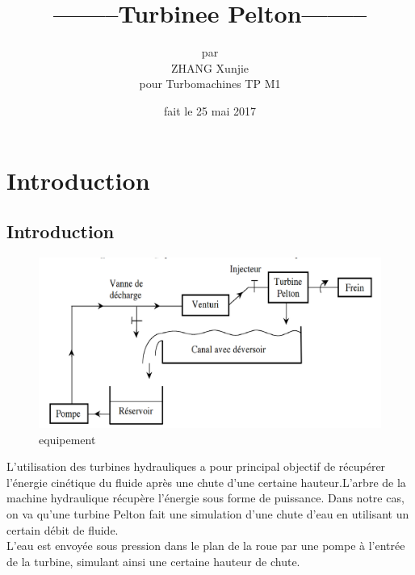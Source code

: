 \documentclass[a4paper,10pt]{report} %
\title{--------\textbf{Turbinee Pelton}--------} %
\author{par\\ZHANG Xunjie \\ pour Turbomachines TP M1} %
\date{fait le 25 mai 2017} %
\begin{document}
\maketitle %






\chapter{Introduction} %





\section{Introduction} %

\begin{figure}[h!]
\centering
\includegraphics[width=1.0\textwidth]{fig/figure1.png}
\caption{equipement}
\end{figure}

L'utilisation des turbines hydrauliques a pour principal objectif de récupérer l'énergie cinétique du fluide après une chute d'une certaine hauteur.L'arbre de la machine hydraulique récupère l'énergie sous forme de puissance. Dans notre cas, on va qu'une turbine Pelton fait une simulation d'une chute d'eau en utilisant un certain débit de fluide.\\

L'eau est envoyée sous pression dans le plan de la roue par une pompe à l'entrée de la turbine, simulant ainsi une certaine hauteur de chute.\\
\end{document}
